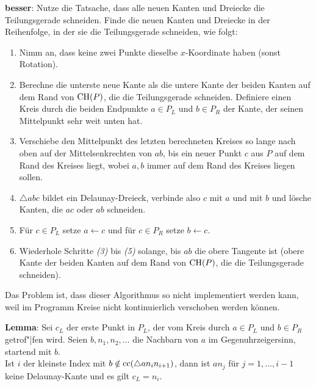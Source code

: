 \textbf{besser}:
Nutze die Tatsache, dass alle neuen Kanten und Dreiecke die Teilungsgerade schneiden.
Finde die neuen Kanten und Dreiecke in der Reihenfolge, in der sie die Teilungsgerade schneiden,
wie folgt:
\begin{enumerate}
    \item
    Nimm an, dass keine zwei Punkte dieselbe $x$-Koordinate haben
    (sonst Rotation).

    \item
    Berechne die unterste neue Kante als die untere Kante der beiden Kanten auf dem Rand von
    $\operatorname{CH}(P)$, die die Teilungsgerade schneiden.
    Definiere einen Kreis durch die beiden Endpunkte $a \in P_L$ und $b \in P_R$ der Kante,
    der seinen Mittelpunkt sehr weit unten hat.

    \item
    Verschiebe den Mittelpunkt des letzten berechneten Kreises
    so lange nach oben auf der Mittelsenkrechten von $ab$,
    bis ein neuer Punkt $c$ aus $P$ auf dem Rand des Kreises liegt,
    wobei $a, b$ immer auf dem Rand des Kreises liegen sollen.

    \item
    $\triangle abc$ bildet ein Delaunay-Dreieck,
    verbinde also $c$ mit $a$ und mit $b$ und lösche Kanten, die $ac$ oder $ab$ schneiden.

    \item
    Für $c \in P_L$ setze $a \leftarrow c$ und für $c \in P_R$ setze $b \leftarrow c$.

    \item
    Wiederhole Schritte \emph{(3)} bis \emph{(5)} solange, bis $ab$ die obere Tangente ist
    (obere Kante der beiden Kanten auf dem Rand von $\operatorname{CH}(P)$, die die Teilungsgerade schneiden).
\end{enumerate}

Das Problem ist, dass dieser Algorithmus so nicht implementiert werden kann,
weil im Programm Kreise nicht kontinuierlich verschoben werden können.

\linie
\pagebreak

\textbf{Lemma}:
Sei $c_L$ der erste Punkt in $P_L$, der vom Kreis durch $a \in P_L$ und $b \in P_R$ getrof"|fen
wird.
Seien $b, n_1, n_2, \dotsc$ die Nachbarn von $a$ im Gegenuhrzeigersinn, startend mit $b$.\\
Ist $i$ der kleinste Index mit $b \notin \operatorname{cc}(\triangle a n_i n_{i+1})$,
dann ist $an_j$ für $j = 1, \dotsc, i - 1$ keine Delaunay-Kante und es gilt $c_L = n_i$.

